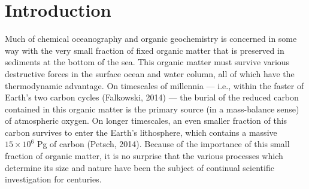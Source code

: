 
\begingroup%
\makeatletter%
\cleardoublepage%
\let\newpage\relax%
\let\clearpage\relax%
\vspace*{\fill}%
\vspace*{\dimexpr-50\p@-\baselineskip}%
\chapter{Introduction}
\label{chap1}
\vspace*{\fill}%
\endgroup%

\clearpage
Much of chemical oceanography and organic geochemistry is concerned in some way with the very small fraction of fixed organic matter that is preserved in sediments at the bottom of the sea. This organic matter must survive various destructive forces in the surface ocean and water column, all of which have the thermodynamic advantage. On timescales of millennia --- i.e., within the faster of Earth's two carbon cycles (Falkowski, 2014) --- the burial of the reduced carbon contained in this organic matter is the primary source (in a mass-balance sense) of atmospheric oxygen. On longer timescales, an even smaller fraction of this carbon survives to enter the Earth's lithosphere, which contains a massive $15\times10^6$ Pg of carbon (Petsch, 2014). Because of the importance of this small fraction of organic matter, it is no surprise that the various processes which determine its size and nature have been the subject of continual scientific investigation for centuries.

